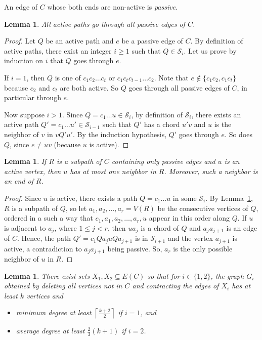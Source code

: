 \documentclass[11pt]{article}
\newtheorem{lemma}[theo]{Lemma}
\begin{document}
An edge of $C$ whose both ends are non-active is \emph{passive}.

\begin{lemma}\label{lem:allpath}
All active paths go through all passive edges of $C$.
\end{lemma}

\begin{proof}
 Let $Q$ be an active path and $e$ be a passive edge of $C$.  By definition of active paths, there exist an integer $i\geq 1$ such that $Q \in \mathcal S_i$. Let us prove by induction on $i$ that $Q$ goes through $e$. 

 If $i=1$, then $Q$ is one of $c_1 c_2 \dots c_t$ or $c_1c_t c_{t-1} \dots c_2$. Note that $ e\notin \{c_1c_2, c_1c_t\}$ because $c_2$ and $c_t$ are both active. So $Q$ goes through all passive edges of $C$, in particular through $e$. 

 Now suppose $i>1$.  Since $Q=c_1\ldots u\in \mathcal S_i$, by definition of $\mathcal S_i$, there exists an active path $Q'= c_1 \dots u' \in \mathcal S_{i-1}$ such that $Q'$ has a chord $u'v$ and $u$ is the neighbor of $v$ in $vQ'u'$.  By the induction hypothesis, $Q'$ goes through $e$.  So does $Q$, since $e\neq uv$ (because $u$ is active). 
\end{proof}



\begin{lemma}\label{lem:nonactivepath}
    If $R$ is a subpath of $C$ containing only passive edges and $u$ is an active vertex, then $u$ has at most one neighbor in $R$.  Moreover, such a neighbor is an end of $R$. 
\end{lemma}

\begin{proof}
    Since $u$ is active, there exists a path $Q = c_1 \dots  u$ in some $\mathcal S_i$. 
By Lemma~\ref{lem:allpath}, $R$ is a subpath of $Q$, so let $a_1, a_2, \ldots, a_r=V(R)$ be the consecutive vertices of $Q$, ordered in a such a way that $c_1, a_1, a_2, \ldots, a_r, u$ appear in this order along $Q$.  
If $u$ is adjacent to $a_j$, where $1\leq j < r$, then $ua_j$ is a chord of $Q$ and $a_ja_{j+1}$ is an edge of $C$. Hence, the path $Q'=c_1 Q a_j u Q a_{j+1}$ is in $\mathcal S_{i+1}$ and the vertex $a_{j+1}$ is  active, a contradiction to $a_ja_{j+1}$ being passive.  So, $a_r$ is the only possible neighbor of $u$ in $R$. 
\end{proof}


\begin{lemma}
    \label{l:contract}
    There exist sets $X_1,X_2\subseteq E(C)$ so that for $i\in\{1,2\}$, the graph $G_i$ obtained by deleting all vertices not in $C$ and contracting the edges of $X_i$
    has at least $k$ vertices and
    \begin{itemize}
        \item minimum degree at least $\left\lceil \frac{k+2}{2}\right\rceil$ if $i=1$, and 
        \item average degree at least $\tfrac{2}{3}(k+1)$ if $i=2$.
    \end{itemize}
\end{lemma}
\end{document}
